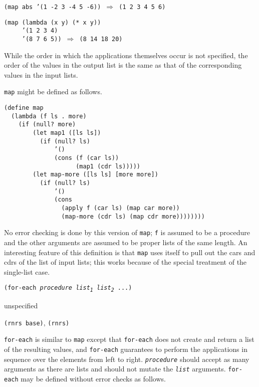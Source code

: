 \begin{alltt}
(map abs '(1 -2 3 -4 5 -6)) \(\Rightarrow\) (1 2 3 4 5 6)

(map (lambda (x y) (* x y))
     '(1 2 3 4)
     '(8 7 6 5)) \(\Rightarrow\) (8 14 18 20)
\end{alltt}


While the order in which the applications themselves occur is not
specified, the order of the values in the output list is the same
as that of the corresponding values in the input lists.

\texttt{map} might be defined as follows.

\begin{alltt}
(define map
  (lambda (f ls . more)
    (if (null? more)
        (let map1 ([ls ls])
          (if (null? ls)
              '()
              (cons (f (car ls))
                    (map1 (cdr ls)))))
        (let map-more ([ls ls] [more more])
          (if (null? ls)
              '()
              (cons
                (apply f (car ls) (map car more))
                (map-more (cdr ls) (map cdr more))))))))
\end{alltt}


No error checking is done by this version of \texttt{map}; \texttt{f} is assumed to
be a procedure and the other arguments are assumed to be proper lists
of the same length.
An interesting feature of this definition is that \texttt{map} uses itself
to pull out the cars and cdrs of the list of input lists; this works
because of the special treatment of the single-list case.


\begin{description}

\label{control_s33}\label{control_desc_for_each}
\item[procedure] \texttt{(for-each \textit{procedure} \textit{list\textsubscript{1}} \textit{list\textsubscript{2}} ...)}



\item[returns] unspecified


\item[libraries] \texttt{(rnrs base)}, \texttt{(rnrs)}
\end{description}


\label{control_s34}\label{control_s35}\texttt{for-each} is similar to \texttt{map} except that
\texttt{for-each} does
not create and return a list of the resulting values, and \texttt{for-each}
guarantees to perform the applications in sequence over the elements from
left to right.
\texttt{\textit{procedure}} should accept as many arguments as there are lists
and should not mutate the \texttt{\textit{list}} arguments.
\texttt{for-each} may be defined without error checks as follows.


